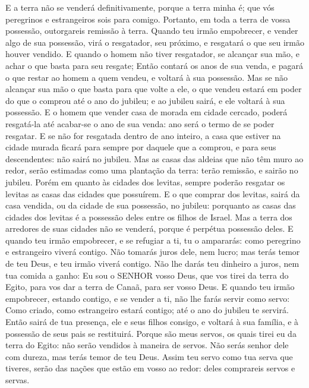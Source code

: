 {E a terra não se venderá definitivamente, porque a terra minha é; que vós peregrinos e estrangeiros sois para comigo.
Portanto, em toda a terra de vossa possessão, outorgareis remissão à terra.
Quando teu irmão empobrecer, e vender algo de sua possessão, virá o resgatador, seu próximo, e resgatará o que seu irmão houver vendido.
E quando o homem não tiver resgatador, se alcançar sua mão, e achar o que basta para seu resgate;
Então contará os anos de sua venda, e pagará o que restar ao homem a quem vendeu, e voltará à sua possessão.
Mas se não alcançar sua mão o que basta para que volte a ele, o que vendeu estará em poder do que o comprou até o ano do jubileu; e ao jubileu sairá, e ele voltará à sua possessão.
E o homem que vender casa de morada em cidade cercado, poderá resgatá-la até acabar-se o ano de sua venda: ano será o termo de se poder resgatar.
E se não for resgatada dentro de ano inteiro, a casa que estiver na cidade murada ficará para sempre por daquele que a comprou, e para seus descendentes: não sairá no jubileu.
Mas as casas das aldeias que não têm muro ao redor, serão estimadas como uma plantação da terra: terão remissão, e sairão no jubileu.
Porém em quanto às cidades dos levitas, sempre poderão resgatar os levitas as casas das cidades que possuírem.
E o que comprar dos levitas, sairá da casa vendida, ou da cidade de sua possessão, no jubileu: porquanto as casas das cidades dos levitas é a possessão deles entre os filhos de Israel.
Mas a terra dos arredores de suas cidades não se venderá, porque é perpétua possessão deles.
E quando teu irmão empobrecer, e se refugiar a ti, tu o ampararás: como peregrino e estrangeiro viverá contigo.
Não tomarás juros dele, nem lucro; mas terás temor de teu Deus, e teu irmão viverá contigo.
Não lhe darás teu dinheiro a juros, nem tua comida a ganho:
Eu sou o SENHOR vosso Deus, que vos tirei da terra do Egito, para vos dar a terra de Canaã, para ser vosso Deus.
E quando teu irmão empobrecer, estando contigo, e se vender a ti, não lhe farás servir como servo:
Como criado, como estrangeiro estará contigo; até o ano do jubileu te servirá.
Então sairá de tua presença, ele e seus filhos consigo, e voltará à sua família, e à possessão de seus pais se restituirá.
Porque são meus servos, os quais tirei eu da terra do Egito: não serão vendidos à maneira de servos.
Não serás senhor dele com dureza, mas terás temor de teu Deus.
Assim teu servo como tua serva que tiveres, serão das nações que estão em vosso ao redor: deles comprareis servos e servas.
}

